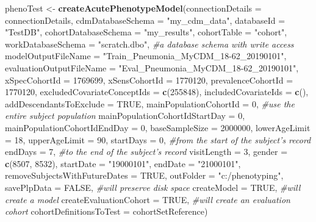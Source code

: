 \documentclass[
]{article}
\newenvironment{Shaded}{\begin{snugshade}}{\end{snugshade}}
\newcommand{\CommentTok}[1]{\textcolor[rgb]{0.56,0.35,0.01}{\textit{#1}}}
\newcommand{\DataTypeTok}[1]{\textcolor[rgb]{0.13,0.29,0.53}{#1}}
\newcommand{\DecValTok}[1]{\textcolor[rgb]{0.00,0.00,0.81}{#1}}
\newcommand{\KeywordTok}[1]{\textcolor[rgb]{0.13,0.29,0.53}{\textbf{#1}}}
\newcommand{\NormalTok}[1]{#1}
\newcommand{\OtherTok}[1]{\textcolor[rgb]{0.56,0.35,0.01}{#1}}
\newcommand{\StringTok}[1]{\textcolor[rgb]{0.31,0.60,0.02}{#1}}
\begin{document}
\begin{Shaded}
\begin{Highlighting}[]
\NormalTok{phenoTest <-}\StringTok{ }\KeywordTok{createAcutePhenotypeModel}\NormalTok{(}\DataTypeTok{connectionDetails =}\NormalTok{ connectionDetails,}
                \DataTypeTok{cdmDatabaseSchema =} \StringTok{"my_cdm_data"}\NormalTok{,}
                \DataTypeTok{databaseId =} \StringTok{"TestDB"}\NormalTok{,}
                \DataTypeTok{cohortDatabaseSchema =} \StringTok{"my_results"}\NormalTok{,}
                \DataTypeTok{cohortTable  =} \StringTok{"cohort"}\NormalTok{,}
                \DataTypeTok{workDatabaseSchema =} \StringTok{"scratch.dbo"}\NormalTok{, }\CommentTok{#a database schema with write access}
                \DataTypeTok{modelOutputFileName =} \StringTok{"Train_Pneumonia_MyCDM_18-62_20190101"}\NormalTok{,}
                \DataTypeTok{evaluationOutputFileName =} \StringTok{"Eval_Pneumonia_MyCDM_18-62_20190101"}\NormalTok{,}
                \DataTypeTok{xSpecCohortId =} \DecValTok{1769699}\NormalTok{,}
                \DataTypeTok{xSensCohortId =} \DecValTok{1770120}\NormalTok{,}
                \DataTypeTok{prevalenceCohortId =} \DecValTok{1770120}\NormalTok{,}
                \DataTypeTok{excludedCovariateConceptIds =} \KeywordTok{c}\NormalTok{(}\DecValTok{255848}\NormalTok{), }
                \DataTypeTok{includedCovariateIds =} \KeywordTok{c}\NormalTok{(),}
                \DataTypeTok{addDescendantsToExclude =} \OtherTok{TRUE}\NormalTok{,}
                \DataTypeTok{mainPopulationCohortId =} \DecValTok{0}\NormalTok{, }\CommentTok{#use the entire subject population}
                \DataTypeTok{mainPopulationCohortIdStartDay =} \DecValTok{0}\NormalTok{,}
                \DataTypeTok{mainPopulationCohortIdEndDay =} \DecValTok{0}\NormalTok{,}
                \DataTypeTok{baseSampleSize =} \DecValTok{2000000}\NormalTok{,}
                \DataTypeTok{lowerAgeLimit =} \DecValTok{18}\NormalTok{, }
                \DataTypeTok{upperAgeLimit =} \DecValTok{90}\NormalTok{,}
                \DataTypeTok{startDays =} \DecValTok{0}\NormalTok{, }\CommentTok{#from the start of the subject's record}
                \DataTypeTok{endDays =} \DecValTok{7}\NormalTok{, }\CommentTok{#to the end of the subject's record}
                \DataTypeTok{visitLength =} \DecValTok{3}\NormalTok{,}
                \DataTypeTok{gender =} \KeywordTok{c}\NormalTok{(}\DecValTok{8507}\NormalTok{, }\DecValTok{8532}\NormalTok{),}
                \DataTypeTok{startDate =} \StringTok{"19000101"}\NormalTok{,}
                \DataTypeTok{endDate =} \StringTok{"21000101"}\NormalTok{,}
                \DataTypeTok{removeSubjectsWithFutureDates =} \OtherTok{TRUE}\NormalTok{,}
                \DataTypeTok{outFolder =} \StringTok{"c:/phenotyping"}\NormalTok{,}
                \DataTypeTok{savePlpData =} \OtherTok{FALSE}\NormalTok{, }\CommentTok{#will preserve disk space}
                \DataTypeTok{createModel =} \OtherTok{TRUE}\NormalTok{, }\CommentTok{#will create a model}
                \DataTypeTok{createEvaluationCohort =} \OtherTok{TRUE}\NormalTok{, }\CommentTok{#will create an evaluation cohort}
                \DataTypeTok{cohortDefinitionsToTest =}\NormalTok{ cohortSetReference)}
\end{Highlighting}
\end{Shaded}
\end{document}
